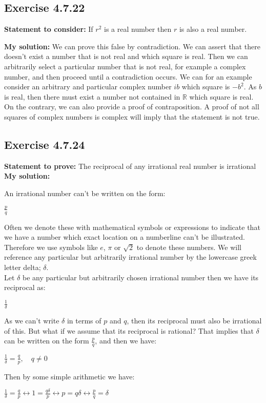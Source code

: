 \documentclass{article}
\newcommand{\cent}[1]{\begin{center}#1\end{center}}
\newcommand{\doubleR}{\mathbb{R}}
\newcommand{\Prove}{\textbf{Statement to prove: }}
\newcommand{\Remark}{\textbf{Statement to consider: }}
\newcommand{\Solution}{\textbf{My solution: }}
\newcommand{\Exercise}[1]{\subsection{Exercise #1}}
\begin{document}
	\Exercise{4.7.22}
	
	\Remark
	If $r^2$ is a real number then $r$ is also a real number.
	
	\Solution
	We can prove this false by contradiction. We can assert that there doesn't exist a number that is not real and which square is real. Then we can arbitrarily select a particular number that is not real, for example a complex number, and then proceed until a contradiction occurs. We can for an example consider an arbitrary and particular complex number $ib$ which square is $-b^2$. As $b$ is real, then there must exist a number not contained in $\doubleR$ which square is real.\\
	
	On the contrary, we can also provide a proof of contraposition. A proof of not all squares of complex numbers is complex will imply that the statement is not true.\\
	
	\Exercise{4.7.24}
	
	\Prove
	The reciprocal of any irrational real number is irrational\\
	
	\Solution
	
	An irrational number can't be written on the form:
	
	\cent{$\frac{p}{q}$}
	
	Often we denote these with mathematical symbols or expressions to indicate that we have a number which exact location on a numberline can't be illustrated. Therefore we use symbols like $e$, $\pi$ or $\sqrt{2}$ to denote these numbers. We will reference any particular but arbitrarily irrational number by the lowercase greek letter delta; $\delta$.\\
	
	Let $\delta$ be any particular but arbitrarily chosen irrational number then we have its reciprocal as:
	
	\cent{$\frac{1}{\delta}$}
	
	As we can't write $\delta$ in terms of $p$ and $q$, then its reciprocal must also be irrational of this. But what if we assume that its reciprocal is rational? That implies that $\delta$ can be written on the form $\frac{p}{q}$, and then we have:
	
	\cent{$\frac{1}{\delta} = \frac{q}{p}, \quad q \neq 0$}
	
	Then by some simple arithmetic we have:
	
	\cent{$\frac{1}{\delta} = \frac{q}{p} \leftrightarrow 1=\frac{q\delta}{p} \leftrightarrow p = q \delta  \leftrightarrow \frac{p}{q} = \delta$}
	
\end{document}
